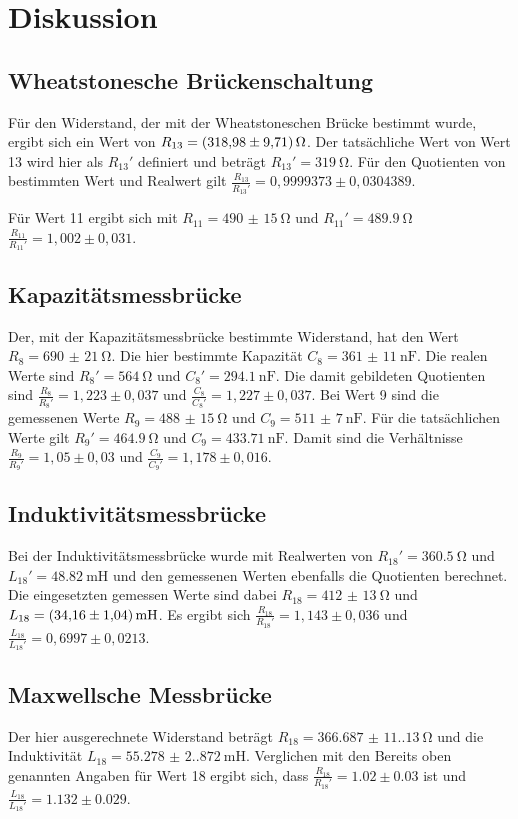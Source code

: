 \section{Diskussion}
    \subsection{Wheatstonesche Brückenschaltung}
    Für den Widerstand, der mit der Wheatstoneschen Brücke bestimmt wurde, ergibt sich ein Wert von $R_{13}=\qty{318,98(9,71)}{\ohm}$.
    Der tatsächliche Wert von Wert 13 wird hier als $R_{13}'$ definiert und beträgt $R_{13}'=\qty{319}{\ohm}$.
    Für den Quotienten von bestimmten Wert und Realwert gilt $\frac{R_{13}}{R_{13}'}=0,9999373\pm0,0304389$.

    \noindent Für Wert 11 ergibt sich mit $R_{11}=\qty{490(15)}{\ohm}$ und $R_{11}'=\qty{489,9}{\ohm}$ $\frac{R_{11}}{R_11'}=1,002\pm0,031$.

    \subsection{Kapazitätsmessbrücke}
    Der, mit der Kapazitätsmessbrücke bestimmte Widerstand, hat den Wert $R_8=\qty{690(21)}{\ohm}$.
    Die hier bestimmte Kapazität $C_8=\qty{361(11)}{\nano\farad}$. 
    Die realen Werte sind $R_8'=\qty{564}{\ohm}$ und $C_8'=\qty{294,1}{\nano\farad}$.
    Die damit gebildeten Quotienten sind $\frac{R_8}{R_8'}=1,223\pm0,037$ und $\frac{C_8}{C_8'}=1,227\pm0,037$.
    Bei Wert 9 sind die gemessenen Werte $R_9=\qty{488(15)}{\ohm}$ und $C_9=\qty{511(7)}{\nano\farad}$.
    Für die tatsächlichen Werte gilt $R_9'=\qty{464,9}{\ohm}$ und $C_9=\qty{433,71}{\nano\farad}$.
    Damit sind die Verhältnisse $\frac{R_9}{R_9'}=1,05\pm0,03$ und $\frac{C_9}{C_9'}=1,178\pm0,016$.
    
    \subsection{Induktivitätsmessbrücke}
    Bei der Induktivitätsmessbrücke wurde mit Realwerten von $R_{18}'=\qty{360,5}{\ohm}$ und $L_{18}'=\qty{48,82}{\milli\henry}$ und den gemessenen Werten ebenfalls die Quotienten berechnet.
    Die eingesetzten gemessen Werte sind dabei $R_{18}=\qty{412(13)}{\ohm}$ und $L_{18}=\qty{34,16(1,04)}{\milli\henry}$.
    Es ergibt sich $\frac{R_{18}}{R_{18}'}=1,143\pm0,036$ und $\frac{L_{18}}{L_{18}'}=0,6997\pm0,0213$.

    \subsection{Maxwellsche Messbrücke}
    Der hier ausgerechnete Widerstand beträgt $R_18=\qty{366.687(11.130)}{\ohm}$ und die Induktivität $L_18=\qty{55.278(2.872)}{\milli\henry}$.
    Verglichen mit den Bereits oben genannten Angaben für Wert 18 ergibt sich, dass $\frac{R_{18}}{R_{18}'}=1.02\pm0.03$ ist und
    $\frac{L_{18}}{L_{18}'}=1.132\pm0.029$.


